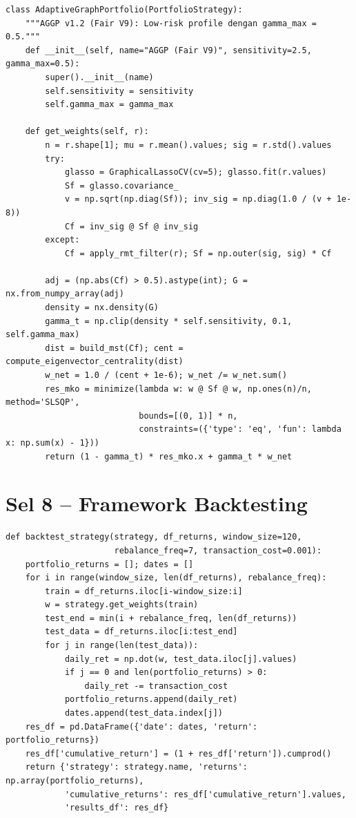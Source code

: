 \documentclass[12pt,a4paper]{article}
\begin{document}
\begin{lstlisting}[caption={Kelas-kelas strategi portofolio}]
class AdaptiveGraphPortfolio(PortfolioStrategy):
    """AGGP v1.2 (Fair V9): Low-risk profile dengan gamma_max = 0.5."""
    def __init__(self, name="AGGP (Fair V9)", sensitivity=2.5, gamma_max=0.5):
        super().__init__(name)
        self.sensitivity = sensitivity
        self.gamma_max = gamma_max

    def get_weights(self, r):
        n = r.shape[1]; mu = r.mean().values; sig = r.std().values
        try:
            glasso = GraphicalLassoCV(cv=5); glasso.fit(r.values)
            Sf = glasso.covariance_
            v = np.sqrt(np.diag(Sf)); inv_sig = np.diag(1.0 / (v + 1e-8))
            Cf = inv_sig @ Sf @ inv_sig
        except:
            Cf = apply_rmt_filter(r); Sf = np.outer(sig, sig) * Cf

        adj = (np.abs(Cf) > 0.5).astype(int); G = nx.from_numpy_array(adj)
        density = nx.density(G)
        gamma_t = np.clip(density * self.sensitivity, 0.1, self.gamma_max)
        dist = build_mst(Cf); cent = compute_eigenvector_centrality(dist)
        w_net = 1.0 / (cent + 1e-6); w_net /= w_net.sum()
        res_mko = minimize(lambda w: w @ Sf @ w, np.ones(n)/n, method='SLSQP',
                           bounds=[(0, 1)] * n,
                           constraints=({'type': 'eq', 'fun': lambda x: np.sum(x) - 1}))
        return (1 - gamma_t) * res_mko.x + gamma_t * w_net
\end{lstlisting}

\section{Sel 8 -- Framework Backtesting}

\begin{lstlisting}[caption={Fungsi simulasi backtest}]
def backtest_strategy(strategy, df_returns, window_size=120,
                      rebalance_freq=7, transaction_cost=0.001):
    portfolio_returns = []; dates = []
    for i in range(window_size, len(df_returns), rebalance_freq):
        train = df_returns.iloc[i-window_size:i]
        w = strategy.get_weights(train)
        test_end = min(i + rebalance_freq, len(df_returns))
        test_data = df_returns.iloc[i:test_end]
        for j in range(len(test_data)):
            daily_ret = np.dot(w, test_data.iloc[j].values)
            if j == 0 and len(portfolio_returns) > 0:
                daily_ret -= transaction_cost
            portfolio_returns.append(daily_ret)
            dates.append(test_data.index[j])
    res_df = pd.DataFrame({'date': dates, 'return': portfolio_returns})
    res_df['cumulative_return'] = (1 + res_df['return']).cumprod()
    return {'strategy': strategy.name, 'returns': np.array(portfolio_returns),
            'cumulative_returns': res_df['cumulative_return'].values,
            'results_df': res_df}
\end{lstlisting}
\end{document}
